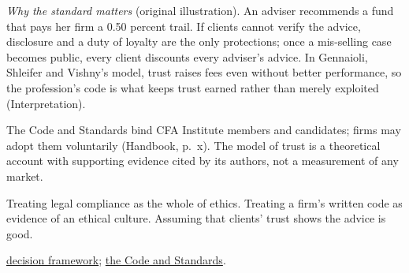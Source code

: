 \begin{qfdefinition}
 \emph{Why the standard matters} (original illustration). An adviser recommends a fund that pays her firm a 0.50 percent trail. If clients cannot verify the advice, disclosure and a duty of loyalty are the only protections; once a mis-selling case becomes public, every client discounts every adviser's advice. In Gennaioli, Shleifer and Vishny's model, trust raises fees even without better performance, so the profession's code is what keeps trust earned rather than merely exploited (Interpretation).

 The Code and Standards bind CFA Institute members and candidates; firms may adopt them voluntarily (Handbook, p.~x). The model of trust is a theoretical account with supporting evidence cited by its authors, not a measurement of any market.

 Treating legal compliance as the whole of ethics. Treating a firm's written code as evidence of an ethical culture. Assuming that clients' trust shows the advice is good.

 \hyperref[meth:ethical-decision-framework]{decision framework}; \hyperref[def:code-of-ethics-standards]{the Code and Standards}.

\end{qfdefinition}


